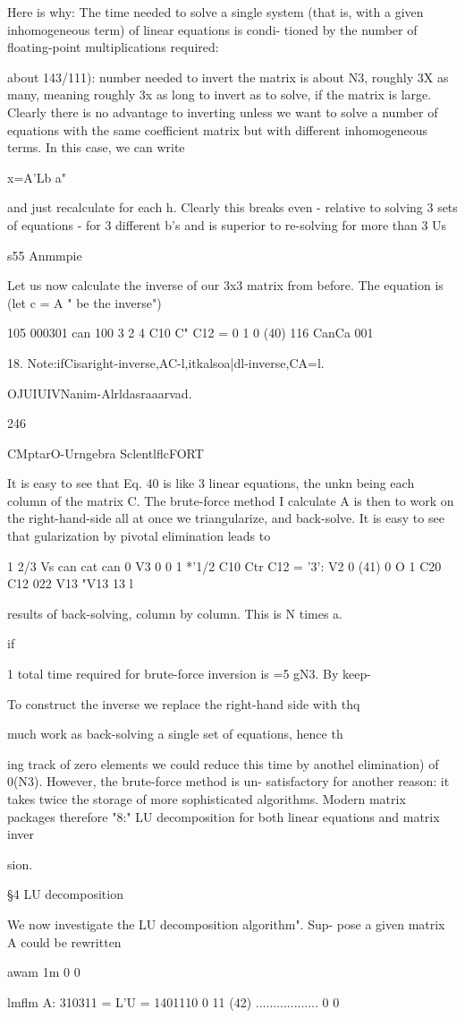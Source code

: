 {Here is why: The time needed to solve a single system (that is,
with a given inhomogeneous term) of linear equations is condi-
tioned by the number of floating-point multiplications required:

about 143/111): number needed to invert the matrix is about N3,
roughly 3X as many, meaning roughly 3x as long to invert as to
solve, if the matrix is large. Clearly there is no advantage to
inverting unless we want to solve a number of equations with the
same coefficient matrix but with different inhomogeneous terms.
In this case, we can write

x=A'Lb a"

and just recalculate for each h. Clearly this breaks even - relative
to solving 3 sets of equations - for 3 different b's and is superior
to re-solving for more than 3 Us

s55 Anmmpie

Let us now calculate the inverse of our 3x3 matrix from before.
The equation is (let c = A " be the inverse")

105 000301 can 100
3 2 4 C10 C" C12 = 0 1 0 (40)
116 CanCa 001

 

18. Note:ifCisaright-inverse,AC-l,itkalsoa|dl-inverse,CA=l.

OJUIUIVNanim-Alrldasraaarvad.

246

CMptarO-Urngebra SclentlflcFORT

It is easy to see that Eq. 40 is like 3 linear equations, the unkn
being each column of the matrix C. The brute-force method I
calculate A is then to work on the right-hand-side all at once
we triangularize, and back-solve. It is easy to see that
gularization by pivotal elimination leads to

1 2/3 Vs can cat can 0 V3 0
0 1 *'1/2 C10 Ctr C12 = '3': V2 0 (41)
0 O 1 C20 C12 022 V13 "V13  13 l

results of back-solving, column by column. This is N times a.

if

1
total time required for brute-force inversion is =5 gN3. By keep-

To construct the inverse we replace the right-hand side with thq

much work as back-solving a single set of equations, hence th

ing track of zero elements we could reduce this time by anothel
elimination) of 0(N3). However, the brute-force method is un-
satisfactory for another reason: it takes twice the storage of more
sophisticated algorithms. Modern matrix packages therefore "8:"
LU decomposition for both linear equations and matrix inver~

sion.

 

\S4 LU decomposition

We now investigate the LU decomposition algorithm". Sup-
pose a given matrix A could be rewritten

awam 1m 0 0 }lmflm
A: 310311 = L'U = 1401110 0  11 (42)
.................. 0 0

